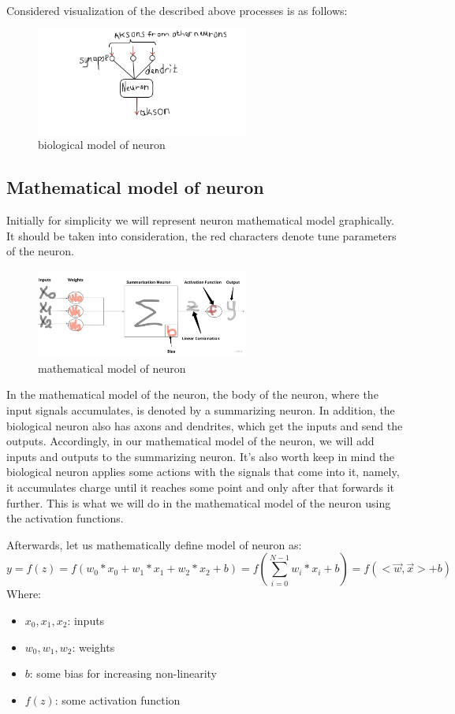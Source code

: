 Considered visualization of the described above processes is as follows:
\begin{figure}[h]
    \centering \includegraphics[width=7cm]{images/neuron_biological_model.png}
    \caption {biological model of neuron}
\end{figure}    

\subsection{Mathematical model of neuron}
Initially for simplicity we will represent neuron mathematical model graphically. It should be taken into consideration, the red characters denote tune parameters of the neuron.     
\begin{figure}[h]
    \centering \includegraphics[width=7cm]{images/neuron_math_model.jpg}
    \caption {mathematical model of neuron}
\end{figure} 

In the mathematical model of the neuron, the body of the neuron, where the input signals accumulates, is denoted by a summarizing neuron. In addition, the biological neuron also has axons and dendrites, which get the inputs and send the outputs. Accordingly, in our mathematical model of the neuron, we will add inputs and outputs to the summarizing neuron. It's also worth keep in mind the biological neuron applies some actions with the signals that come into it, namely, it accumulates charge until it reaches some point and only after that forwards it further. This is what we will do in the mathematical model of the neuron using the activation functions.

Afterwards, let us mathematically define model of neuron as:
\[ y = f(z) = f(w_0*x_0+w_1*x_1+w_2*x_2+b) = f(\sum\limits_{i=0}^{N-1} w_i*x_i+b) = f(<\overrightarrow{w}, \overrightarrow{x}>+b) \]
Where:
\begin{itemize}
    \item $x_0, x_1, x_2$: inputs
    \item $w_0, w_1, w_2$: weights 
    \item $b$: some bias for increasing non-linearity   
    \item $f(z)$: some activation function 
\end{itemize}

